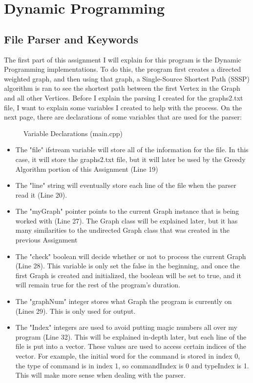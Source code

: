 \documentclass[letterpaper, 10pt]{article}
\begin{document}
\section{Dynamic Programming}
\setcounter{figure}{0} %

\subsection{File Parser and Keywords}
\noindent
The first part of this assignment I will explain for this program is the Dynamic Programming implementations. To do this, the program first creates a directed weighted graph, and then using that graph, a Single-Source Shortest Path (SSSP) algorithm is ran to see the shortest path between the first Vertex in the Graph and all other Vertices. Before I explain the parsing I created for the graphs2.txt file, I want to explain some variables I created to help with the process. On the next page, there are declarations of some variables that are used for the parser:

\begin{figure}[H]
  \centering
   
  \caption{Variable Declarations (main.cpp)}
  \label{fig:figure2.1}
\end{figure}

\vspace{1em}

\noindent
\begin{itemize}
    \item The "file" ifstream variable will store all of the information for the file. In this case, it will store the graphs2.txt file, but it will later be used by the Greedy Algorithm portion of this Assignment (Line 19)
    \item The "line" string will eventually store each line of the file when the parser read it (Line 20).
    \item The "myGraph" pointer points to the current Graph instance that is being worked with (Line 27). The Graph class will be explained later, but it has many similarities to the undirected Graph class that was created in the previous Assignment 
    \item The "check" boolean will decide whether or not to process the current Graph (Line 28). This variable is only set the false in the beginning, and once the first Graph is created and initialized, the boolean will be set to true, and it will remain true for the rest of the program's duration.
    \item The "graphNum" integer stores what Graph the program is currently on (Lines 29). This is only used for output.
    \item The "Index" integers are used to avoid putting magic numbers all over my program (Line 32). This will be explained in-depth later, but each line of the file is put into a vector. These values are used to access certain indices of the vector. For example, the initial word for the command is stored in index 0, the type of command is in index 1, so commandIndex is 0 and typeIndex is 1. This will make more sense when dealing with the parser.    
\end{itemize}
\end{document}
